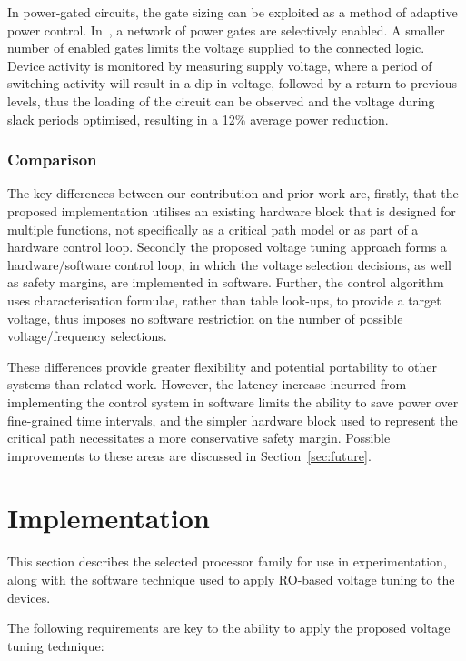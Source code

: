 \documentclass[a4paper,twocolumn,DIV=16]{scrartcl}
\begin{document}
In power-gated circuits, the gate sizing can be exploited as a method of
adaptive power control. In~\cite{Hsieh2011}, a network of power gates are
selectively enabled. A smaller number of enabled gates limits the voltage
supplied to the connected logic. Device activity is monitored by measuring
supply voltage, where a period of switching activity will result in a dip in
voltage, followed by a return to previous levels, thus the loading of the
circuit can be observed and the voltage during slack periods optimised,
resulting in a 12\% average power reduction.

\subsubsection*{Comparison}

The key differences between our contribution and prior work are, firstly, that
the proposed implementation utilises an existing hardware block that is designed
for multiple functions, not specifically as a critical path model or as part of
a hardware control loop. Secondly the proposed voltage tuning approach forms a
hardware/software control loop, in which the voltage selection decisions, as
well as safety margins, are implemented in software. Further, the control
algorithm uses characterisation formulae, rather than table look-ups, to provide
a target voltage, thus imposes no software restriction on the number of possible
voltage/frequency selections.

These differences provide greater flexibility and potential portability to other
systems than related work. However, the latency increase incurred from
implementing the control system in software limits the ability to save power
over fine-grained time intervals, and the simpler hardware block used to
represent the critical path necessitates a more conservative safety margin.
Possible improvements to these areas are discussed in Section~\ref{sec:future}.

\section{Implementation}
\label{sec:imp}

This section describes the selected processor family for use in experimentation,
along with the software technique used to apply RO-based voltage tuning to the
devices.

The following requirements are key to the ability to apply the proposed voltage
tuning technique:
\end{document}
